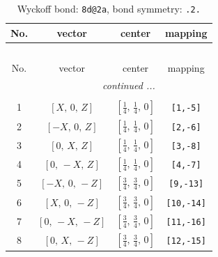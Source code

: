 \documentclass[fleqn,8pt]{jsarticle}
\begin{document}
\begin{longtable}{cccc}
\caption{Wyckoff bond: {\tt 8d@2a}, bond symmetry: {\tt .2.}}
 \\
 \hline \hline
No. & vector & center & mapping \\ \hline \endfirsthead

\multicolumn{3}{l}{\tablename\ \thetable{}} \\
 \hline \hline
No. & vector & center & mapping \\ \hline \endhead

 \hline \hline
\multicolumn{3}{r}{\footnotesize\it continued ...} \\ \endfoot

 \hline \hline
\multicolumn{3}{r}{} \\ \endlastfoot

1 & $\left[ X,\, 0,\, Z \right]$ & $\left[ \frac{1}{4},\, \frac{1}{4},\, 0 \right]$ & {\tt [1,-5]} \\ \hline
2 & $\left[ - X,\, 0,\, Z \right]$ & $\left[ \frac{1}{4},\, \frac{1}{4},\, 0 \right]$ & {\tt [2,-6]} \\ \hline
3 & $\left[ 0,\, X,\, Z \right]$ & $\left[ \frac{1}{4},\, \frac{1}{4},\, 0 \right]$ & {\tt [3,-8]} \\ \hline
4 & $\left[ 0,\, - X,\, Z \right]$ & $\left[ \frac{1}{4},\, \frac{1}{4},\, 0 \right]$ & {\tt [4,-7]} \\ \hline
5 & $\left[ - X,\, 0,\, - Z \right]$ & $\left[ \frac{3}{4},\, \frac{3}{4},\, 0 \right]$ & {\tt [9,-13]} \\ \hline
6 & $\left[ X,\, 0,\, - Z \right]$ & $\left[ \frac{3}{4},\, \frac{3}{4},\, 0 \right]$ & {\tt [10,-14]} \\ \hline
7 & $\left[ 0,\, - X,\, - Z \right]$ & $\left[ \frac{3}{4},\, \frac{3}{4},\, 0 \right]$ & {\tt [11,-16]} \\ \hline
8 & $\left[ 0,\, X,\, - Z \right]$ & $\left[ \frac{3}{4},\, \frac{3}{4},\, 0 \right]$ & {\tt [12,-15]} \\
\end{longtable}
\renewcommand{\arraystretch}{1.2}
\end{document}
